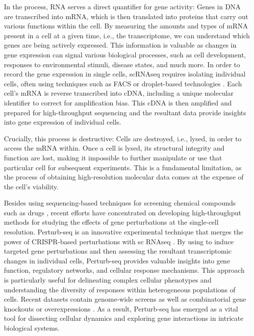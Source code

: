 In the process, RNA serves a direct quantifier for gene activity: Genes in \acrfull{DNA} are transcribed into \acrfull{mRNA}, which is then translated into proteins that carry out various functions within the cell.
By measuring the amounts and types of \acrshort{mRNA} present in a cell at a given time, i.e., the transcriptome, we can understand which genes are being actively expressed. This information is valuable as changes in gene expression can signal various biological processes, such as cell development, responses to environmental stimuli, disease states, and much more. 
In order to record the gene expression in single cells, \acrshort{sc}\acrshort{RNAseq} requires isolating individual cells, often using techniques such as \acrfull{FACS} \citep{julius1972demonstration} or droplet-based technologies \citep{brouzes2009droplet, mazutis2013single, debs2012functional}. Each cell's \acrshort{mRNA} is reverse transcribed into \acrfull{cDNA}, including a unique molecular identifier to correct for amplification bias.
This \acrshort{cDNA} is then amplified and prepared for high-throughput sequencing and the resultant data provide insights into gene expression of individual cells.

Crucially, this process is destructive: Cells are destroyed, i.e., lysed, in order to access the \acrshort{mRNA} within.
Once a cell is lysed, its structural integrity and function are lost, making it impossible to further manipulate or use that particular cell for subsequent experiments.
This is a fundamental limitation, as the process of obtaining high-resolution molecular data comes at the expense of the cell's viability.

Besides using sequencing-based techniques for screening chemical compounds such as drugs \citep{srivatsan2020massively}, recent efforts have concentrated on developing high-throughput methods for studying the effects of gene perturbations at the single-cell resolution.
Perturb-seq \citep{dixit2016perturb} is an innovative experimental technique that merges the power of \acrfull{CRISPR}-based perturbations with \acrlong{sc} \acrlong{RNAseq} \citep{mali2013rna}. By using  to induce targeted gene perturbations and then assessing the resultant transcriptomic changes in individual cells, Perturb-seq provides valuable insights into gene function, regulatory networks, and cellular response mechanisms. This approach is particularly useful for delineating complex cellular phenotypes and understanding the diversity of responses within heterogeneous populations of cells.
Recent datasets contain genome-wide screens \citep{replogle2022mapping} as well as combinatorial gene knockouts or overexpressions \citep{norman2019exploring}. As a result, Perturb-seq has emerged as a vital tool for dissecting cellular dynamics and exploring gene interactions in intricate biological systems.

